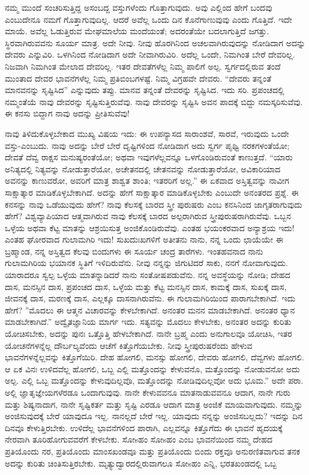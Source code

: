 ನಮ್ಮ ಮುಂದೆ ಸಂಚರಿಸುತ್ತಿದ್ದ ಅಸಂಬದ್ದ ವಸ್ತುಗಳೆಂದು ಗೊತ್ತಾಗುವುದು. ಅವು ಎಲ್ಲಿಂದ ಹೇಗೆ ಬಂದವು ಎಂಬುದೇನೂ ನಮಗೆ ಗೊತ್ತಾಗುವುದಿಲ್ಲ. ಆದರೆ ಅವೆಲ್ಲ ಒಂದು ದಿನ ಕೊನೆಗಾಣುವುವು ಎಂದು ಗೊತ್ತಿದೆ. ಇದೇ ಮಾಯೆ. ಅವೆಲ್ಲ ಓಡುತ್ತಿರುವ ಮೇಘಮಾಲೆಯ ಮಂದೆಯಂತೆ; ಅದರಂತೆಯೇ ಬದಲಾಗುತ್ತಿದೆ ಜಗತ್ತು. ಸ್ಥಿರವಾಗಿರುವವನು ಸೂರ್ಯ ಮಾತ್ರ. ಅದೇ ನೀವು. ನೀವು ಹೊರಗಿನಿಂದ ಅಚಲವಾಗಿರುವುದನ್ನು ನೋಡಿದಾಗ ಅದನ್ನು ದೇವರು ಎನ್ನುವಿರಿ. ಒಳಗಿನಿಂದ ನೋಡಿದಾಗ ಅದೇ ನೀವಾಗಿರುವಿರಿ. ಅದೆಲ್ಲ ಒಂದೇ, ನಿಮಗಿಂತ ಬೇರೆ ದೇವರಿಲ್ಲ. ನಿಜವಾಗಿ ನಿಮಗಿಂತ ಮೇಲಾದ ದೇವರಿಲ್ಲ. ಇತರ ದೇವತೆಗಳೆಲ್ಲ ನಿಮ್ಮ ಪಾಲಿಗೆ ಅಲ್ಪ. ಸ್ವರ್ಗದಲ್ಲಿರುವ ತಂದೆ ಮುಂತಾದ ದೇವರ ಭಾವನೆಗಳೆಲ್ಲ ನಿಮ್ಮ ಪ್ರತಿಬಿಂಬಗಳಷ್ಟೆ. ನಿಮ್ಮ ವಿಗ್ರಹವೇ ದೇವರು. “ದೇವರು ತನ್ನಂತೆ ಮಾನವನನ್ನು ಸೃಷ್ಟಿಸಿದ'' ಎನ್ನುವುದು ತಪ್ಪು. ಮಾನವ ತನ್ನಂತೆ ದೇವರನ್ನು ಸೃಷ್ಟಿಸಿದ. ಇದು ಸರಿ. ಪ್ರಪಂಚದಲ್ಲಿ ನಮ್ಮಂತೆಯೆ ನಾವು ದೇವರನ್ನು ಸೃಷ್ಟಿಸುತ್ತಿರುವೆವು. ನಾವು ದೇವರನ್ನು ಸೃಷ್ಟಿಸಿ ಅವನ ಪಾದಕ್ಕೆ ಬಿದ್ದು ನಮಸ್ಕರಿಸುವೆವು. ಈ ಕನಸು ಬಿದ್ದಾಗ ನಾವು ಅದನ್ನು ಪ್ರೀತಿಸುವೆವು!

ನಾವು ತಿಳಿದುಕೊಳ್ಳಬೇಕಾದ ಮುಖ್ಯ ವಿಷಯ ಇದು: ಈ ಉಪನ್ಯಾಸದ ಸಾರಾಂಶವೆ, ಸಾರವೆ, ಇರುವುದು ಒಂದೇ ವಸ್ತು-ಎಂಬುದು. ನಾವು ಅದನ್ನು ಬೇರೆ ಬೇರೆ ದೃಷ್ಟಿಗಳಿಂದ ನೋಡಿದಾಗ ಅದು ಸ್ವರ್ಗ ಪೃಥ್ವಿ ನರಕಗಳಂತೆಯೋ; ದೇವತೆ ದೆವ್ವ ರಾಕ್ಷಸ ಮನುಷ್ಯರಂತೆಯೋ; ಅಥವಾ ಇವುಗಳೆಲ್ಲವನ್ನೂ ಒಳಗೊಂಡಿರುವಂತೆ ಕಾಣುತ್ತದೆ. “ಯಾರು ಅನಿತ್ಯದಲ್ಲಿ ನಿತ್ಯವನ್ನು ನೋಡುತ್ತಾರೆಯೋ, ಅಚೇತನದಲ್ಲಿ ಚೇತನವನ್ನು ನೋಡುತ್ತಾರೆಯೋ, ಅವಿಕಾರಿಯಾದ ಅವನನ್ನು ಕಾಣುವರೋ, ಅವರಿಗೆ ಮಾತ್ರ ಶಾಶ್ವತ ಶಾಂತಿ; ಇತರರಿಗೆ ಅಲ್ಲ.” ಈ ಏಕವಾದ ಅಸ್ತಿತ್ವವನ್ನು ನಾವೀಗ ಸಾಕ್ಷಾತ್ಕಾರ ಮಾಡಿಕೊಳ್ಳಬೇಕಾಗಿದೆ. ಅದನ್ನು ಹೇಗೆ ಸಾಕ್ಷಾತ್ಕಾರ ಮಾಡಿಕೊಳ್ಳಬೇಕು ಎಂಬುದೇ ಅನಂತರದ ಪ್ರಶ್ನೆ. ಈ ಕನಸನ್ನು ನಾವು ಒಡೆಯುವುದು ಹೇಗೆ? ನಾವು ಕೆಲಸಕ್ಕೆ ಬಾರದ ಸ್ತ್ರೀ ಪುರುಷರು ಎಂಬ ಕನಸಿನಿಂದ ಜಾಗೃತರಾಗುವುದು ಹೇಗೆ? ವಿಶ್ವವ್ಯಾಪಿಯಾದ ಆತ್ಮವಾಗಿರುವ ನಾವು ಕೆಲಸಕ್ಕೆ ಬಾರದ ಅಲ್ಪರಾಗಿರುವ ಸ್ತ್ರೀಪುರುಷರಾಗಿರುವೆವು. ಒಬ್ಬನ ಒಳ್ಳೆಯ ಅಥವಾ ಕೆಟ್ಟ ಮಾತನ್ನು ಆಶ್ರಯಿಸುತ್ತ ಅಂಜಿಕೊಂಡಿರುವೆವು. ಎಂತಹ ಭಯಂಕರವಾದ ಅನ್ಯಾಶ್ರಯ ಇದು! ಎಂತಹ ಘೋರವಾದ ಗುಲಾಮಗಿರಿ ಇದು! ಸುಖದುಃಖಗಳಿಗೆ ಅತೀತನು ನಾನು, ನನ್ನ ಒಂದು ಛಾಯೆಯೇ ಈ ಬ್ರಹ್ಮಾಂಡ, ನನ್ನ ಅಸ್ತಿತ್ವದ ಕೆಲವು ಬಿಂದುಗಳು ಈ ಸೂರ್ಯ ಚಂದ್ರ ತಾರೆಗಳು. ಇಂತಹವನಾದ ನಾನು ಗುಲಾಮಗಿರಿಯ ಭಯಾನಕ ಸ್ಥಿತಿಗೆ ಇಳಿದಿರುವೆನು. ನೀವು ನನ್ನನ್ನು ಜಿಗುಟಿದರೆ ಸಾಕು, ನನಗೆ ನೋವಾಗುವುದು. ಯಾರಾದರೂ ಸ್ವಲ್ಪ ಒಳ್ಳೆಯ ಮಾತನ್ನಾಡಿದರೆ ನಾನು ಸಂತೋಷಪಡುವೆನು. ನನ್ನ ಅವಸ್ಥೆಯನ್ನು ನೋಡಿ; ದೇಹದ ದಾಸ, ಮನಸ್ಸಿನ ದಾಸ, ಪ್ರಪಂಚದ ದಾಸ, ಒಳ್ಳೆಯ ಮತ್ತು ಕೆಟ್ಟ ಮನಸ್ಸಿನ ದಾಸ, ಕಾಮಕ್ಕೆ ದಾಸ, ಸುಖಕ್ಕೆ ದಾಸ, ಜೀವನಕ್ಕೆ ದಾಸ, ಮರಣಕ್ಕೆ ದಾಸ, ಎಲ್ಲಕ್ಕೂ ದಾಸನಾಗಿರುವೆನು. ಈ ಗುಲಾಮಗಿರಿಯಿಂದ ಪಾರಾಗಬೇಕಾಗಿದೆ. ಇದು ಹೇಗೆ? ''ಮೊದಲು ಈ ಆತ್ಮನ ವಿಚಾರವನ್ನು ಕೇಳಬೇಕಾಗಿದೆ. ಅನಂತರ ಮನನ ಮಾಡಬೇಕಾಗಿದೆ. ಅನಂತರ ಧ್ಯಾನ ಮಾಡಬೇಕಾಗಿದೆ.'' ಅದ್ವೈತಜ್ಞಾನಿಯ ಮಾರ್ಗ ಇದು. ಸತ್ಯವನ್ನು ಮೊದಲು ಕೇಳಬೇಕು, ಅನಂತರ ಅದನ್ನು ಕುರಿತು ಯೋಚಿಸಬೇಕು, ಅದನ್ನು ಪುನಃ ಒತ್ತೊತ್ತಿ ಹೇಳಬೇಕಾಗಿದೆ. ನಾನೇ ಬ್ರಹ್ಮ ಎಂದು ಅನುಗಾಲವೂ ಯೋಚಿಸಿ, ಇತರ ಯೋಚನೆಗಳನ್ನೆಲ್ಲ ದೌರ್ಬಲ್ಯವೆಂದು ಆಚೆಗೆ ಕಿತ್ತೊಗೆಯಬೇಕು. ನೀವು ಸ್ತ್ರೀಪುರುಷರೆಂದು ಹೇಳುವ ಭಾವನೆಗಳನ್ನೆಲ್ಲವನ್ನು ಕಿತ್ತೊಗೆಯಿರಿ. ದೇಹ ಹೋಗಲಿ, ಮನಸ್ಸು ಹೋಗಲಿ, ದೇವರು ಹೋಗಲಿ, ದೆವ್ವಗಳು ಹೋಗಲಿ. ಆ ಏಕ ವಿನಃ ಉಳಿದವೆಲ್ಲ ಹೋಗಲಿ, ಒಬ್ಬ ಎಲ್ಲಿ ಮತ್ತೊಂದನ್ನು ಕೇಳುವನೊ, ಮತ್ತೊಂದನ್ನು ನೋಡುವನೋ ಅದು ಅಲ್ಪ. ಎಲ್ಲಿ ಒಬ್ಬ ಮತ್ತೊಂದನ್ನು ಕೇಳುವುದಿಲ್ಲವೊ, ಮತ್ತೊಂದನ್ನು ನೋಡಿವುದಿಲ್ಲವೋ ಅದು ಭೂಮ.” ಅದೇ ಪರಾ. ಅಲ್ಲಿ ಜ್ಞಾತೃಜ್ಞೇಯಗಳೆರಡೂ ಒಂದಾಗುವುವು. ನಾನೇ ಕೇಳುವವನೂ ಮಾತನಾಡುವವನೂ ಆದಾಗ, ನಾನೇ ಗುರು ಮತ್ತು ಶಿಷ್ಯನಾದಾಗ, ನಾನೇ ಸೃಷ್ಟಿಕರ್ತ ಮತ್ತು ಸೃಷ್ಟಿ ಎರಡೂ ಆದಾಗ ಮಾತ್ರ ಅಂಜಿಕೆ ಮಾಯವಾಗುವುದು. ನಮ್ಮನ್ನು ಅಂಜಿಸುವುದಕ್ಕೆ ಬೇರೆ ಯಾವುದೂ ಇಲ್ಲ. ನಾನಲ್ಲದೆ ಬೇರೆ ಇಲ್ಲ. ಯಾವುದು ನನ್ನನ್ನು ಅಂಜಿಸಬಲ್ಲದು? ಇದನ್ನು ದಿನ ದಿನವೂ ಕೇಳುತ್ತಿರಬೇಕು. ಉಳಿದೆಲ್ಲ ಭಾವನೆಗಳಿಂದ ಪಾರಾಗಿ, ಎಲ್ಲವನ್ನೂ ಕಿತ್ತೊಗೆದು ಈ ಭಾವನೆ ಹೃದಯಕ್ಕೆ ನೇರವಾಗಿ ತೂರಿಹೋಗುವವರೆಗೆ ಕೇಳಬೇಕು. ಸೋsಹಂ ಸೋsಹಂ ಎಂಬ ಭಾವನೆಯಿಂದ ನಮ್ಮ ದೇಹದ ಪ್ರತಿಯೊಂದು ನರ, ಪ್ರತಿಯೊಂದು ಮಾಂಸಖಂಡವೂ ಮತ್ತು ಪ್ರತಿಯೊಂದು ಬಿಂದು ರಕ್ತವೂ ಅನುರಣಿತವಾಗುವ ತನಕ ಅದನ್ನು ಕುರಿತು ಚಿಂತಿಸುತ್ತಿರಬೇಕು. ಮೃತ್ಯುದ್ವಾರದಲ್ಲಿರುವಾಗಲೂ ಸೋsಹಂ ಎನ್ನಿ, ಭರತಖಂಡದಲ್ಲಿ ಒಬ್ಬ 